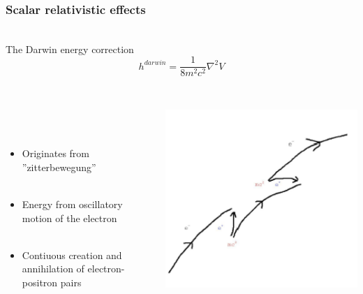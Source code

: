 \documentclass[mathserif,10pt]{beamer}
\begin{document}
\begin{frame}
    \frametitle{Scalar relativistic effects}
    \ \\
    \centering
    The Darwin energy correction
    \begin{equation}
	\nonumber
	h^{darwin} = \frac{1}{8m^2c^2} \nabla^2 V
    \end{equation}
    \ \\
    \begin{columns}
    \begin{column}{.40\textwidth}
    \ \\
    \ \\
    \begin{itemize}
	\item Originates from ''zitterbewegung''\\
    \ \\
	\item Energy from oscillatory motion of the electron\\
    \ \\
	\item Contiuous creation and annihilation of electron-positron pairs
    \end{itemize}
    \ \\
    \end{column}
    \begin{column}{.60\textwidth}
	\centering
	\includegraphics[viewport = 0 0 300 300, clip, scale=0.4]{figures/zitterbewegung.pdf}
    \end{column}
    \end{columns}
\end{frame}
\end{document}
